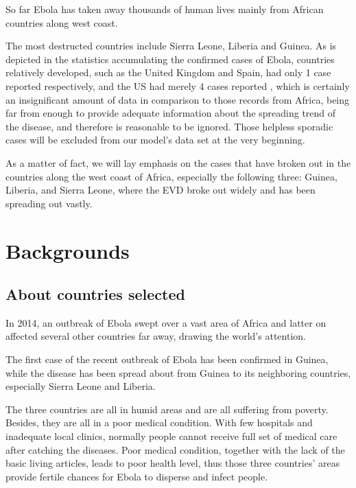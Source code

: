 \documentclass[12pt]{article}
\begin{document}


So far Ebola has taken away thousands of human lives mainly from African countries along west coast.

The most destructed countries include Sierra Leone, Liberia and Guinea. As is depicted in the statistics accumulating the confirmed cases of Ebola, countries relatively developed, such as the United Kingdom and Spain, had only 1 case reported respectively, and the US had merely 4 cases reported \cite{NumOfCases}, which is certainly an insignificant amount of data in comparison to those records from Africa, being far from enough to provide adequate information about the spreading trend of the disease, and therefore is reasonable to be ignored. Those helpless sporadic cases will be excluded from our model's data set at the very beginning.

As a matter of fact, we will lay emphasis on the cases that have broken out in the countries along the west coast of Africa, especially the following three: Guinea, Liberia, and Sierra Leone, where the EVD broke out widely and has been spreading out vastly. 



\section{Backgrounds}

\subsection{About countries selected}%

In 2014, an outbreak of Ebola swept over a vast area of Africa and latter on affected several other countries far away, drawing the world's attention.

The first case of the recent outbreak of Ebola has been confirmed in Guinea, while the disease has been spread about from Guinea to its neighboring countries, especially Sierra Leone and Liberia. 

The three countries are all in humid areas and are all suffering from poverty. Besides, they are all in a poor medical condition. With few hospitals and inadequate local clinics, normally people cannot receive full set of medical care after catching the diseases. Poor medical condition, together with the lack of the basic living articles, leads to poor health level, thus those three countries' areas provide fertile chances for Ebola to disperse and infect people.
\end{document}
